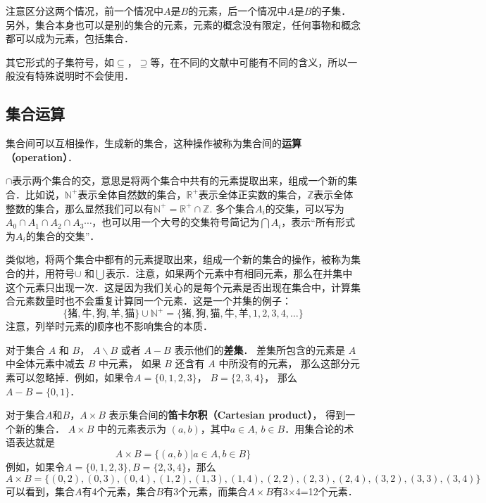 注意区分这两个情况，前一个情况中$A$是$B$的元素，后一个情况中$A$是$B$的子集．另外，集合本身也可以是别的集合的元素，元素的概念没有限定，任何事物和概念都可以成为元素，包括集合．

其它形式的子集符号，如$\subseteq$，$\supseteq$等，在不同的文献中可能有不同的含义，所以一般没有特殊说明时不会使用．


\subsection{集合运算}

集合间可以互相操作，生成新的集合，这种操作被称为集合间的\textbf{运算（operation）}．

$\cap$表示两个集合的交，意思是将两个集合中共有的元素提取出来，组成一个新的集合．比如说，$\mathbb{N^+}$表示全体自然数的集合，$\mathbb{R^+}$表示全体正实数的集合，$\mathbb{Z}$表示全体整数的集合，那么显然我们可以有$\mathbb{N^+}=\mathbb{R^+}\cap\mathbb{Z}$. 多个集合$A_i$的交集，可以写为$A_0\cap A_1\cap A_2\cap A_3⋯$，也可以用一个大号的交集符号简记为$\bigcap A_i$，表示“所有形式为$A_i$的集合的交集”．

类似地，将两个集合中都有的元素提取出来，组成一个新的集合的操作，被称为集合的并，用符号$\cup$ 和$\bigcup$表示．注意，如果两个元素中有相同元素，那么在并集中这个元素只出现一次．这是因为我们关心的是每个元素是否出现在集合中，计算集合元素数量时也不会重复计算同一个元素．这是一个并集的例子：
\begin{equation}
\{\text{猪}, \text{牛}, \text{狗}, \text{羊}, \text{猫}\}\cup\mathbb{N^+}=\{\text{猪}, \text{狗}, \text{猫}, \text{牛}, \text{羊}, 1, 2,3,4,\dots\}
\end{equation}
注意，列举时元素的顺序也不影响集合的本质．

对于集合 $A$ 和 $B$， $A\backslash B$ 或者 $A-B$ 表示他们的\textbf{差集}． 差集所包含的元素是 $A$ 中全体元素中减去 $B$ 中元素， 如果 $B$ 还含有 $A$ 中所没有的元素， 那么这部分元素可以忽略掉．例如，如果令$A=\{0,1,2,3\}$， $B=\{2,3,4\}$， 那么 $A-B=\{0,1\}$．

对于集合$A$和$B$，$A\times B$ 表示集合间的\textbf{笛卡尔积（Cartesian product）}， 得到一个新的集合． $A\times B$ 中的元素表示为 $(a,b)$，其中$a\in A$, $b\in B$．用集合论的术语表达就是
\begin{equation}
A\times B=\{(a,b)|a\in A, b\in B\}
\end{equation}
例如，如果令$A=\{0,1,2,3\}, B=\{2,3,4\}$，那么
\begin{equation}
A\times B=\{ (0,2),(0,3),(0,4),(1,2),(1,3),(1,4),(2,2),(2,3),(2,4),(3,2),(3,3),(3,4) \}
\end{equation}
可以看到，集合$A$有4个元素，集合$B$有3个元素，而集合$A\times B$有3$\times$4=12个元素．

